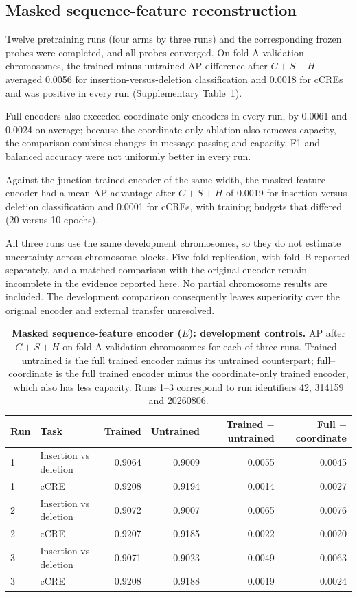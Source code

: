 \documentclass[11pt]{article}
\begin{document}
\begin{bibunit}[unsrtnat]
\subsection{Masked sequence-feature reconstruction}
Twelve pretraining runs (four arms by three runs) and the corresponding frozen probes were completed, and all probes converged. On fold-A validation chromosomes, the trained-minus-untrained AP difference after $C+S+H$ averaged 0.0056 for insertion-versus-deletion classification and 0.0018 for cCREs and was positive in every run (Supplementary Table~\ref{S-stab:development}).

Full encoders also exceeded coordinate-only encoders in every run, by 0.0061 and 0.0024 on average; because the coordinate-only ablation also removes capacity, the comparison combines changes in message passing and capacity. F1 and balanced accuracy were not uniformly better in every run.

Against the junction-trained encoder of the same width, the masked-feature encoder had a mean AP advantage after $C+S+H$ of 0.0019 for insertion-versus-deletion classification and 0.0001 for cCREs, with training budgets that differed (20 versus 10 epochs).

All three runs use the same development chromosomes, so they do not estimate uncertainty across chromosome blocks. Five-fold replication, with fold~B reported separately, and a matched comparison with the original encoder remain incomplete in the evidence reported here. No partial chromosome results are included. The development comparison consequently leaves superiority over the original encoder and external transfer unresolved.

\begin{table}[H]
\centering
\caption{\textbf{Masked sequence-feature encoder ($E$): development controls.} AP after $C+S+H$ on fold-A validation chromosomes for each of three runs. Trained--untrained is the full trained encoder minus its untrained counterpart; full--coordinate is the full trained encoder minus the coordinate-only trained encoder, which also has less capacity. Runs 1--3 correspond to run identifiers 42, 314159 and 20260806.}
\label{S-stab:development}
\footnotesize
\setlength{\tabcolsep}{5pt}
\begin{tabular}{@{}llrrrr@{}}
\toprule
Run & Task & Trained & Untrained & Trained $-$ untrained & Full $-$ coordinate \\
\midrule
1 & Insertion vs deletion & 0.9064 & 0.9009 & 0.0055 & 0.0045 \\
1 & cCRE & 0.9208 & 0.9194 & 0.0014 & 0.0027 \\
2 & Insertion vs deletion & 0.9072 & 0.9007 & 0.0065 & 0.0076 \\
2 & cCRE & 0.9207 & 0.9185 & 0.0022 & 0.0020 \\
3 & Insertion vs deletion & 0.9071 & 0.9023 & 0.0049 & 0.0063 \\
3 & cCRE & 0.9208 & 0.9188 & 0.0019 & 0.0024 \\
\bottomrule
\end{tabular}
\end{table}


\end{bibunit}
\end{document}

